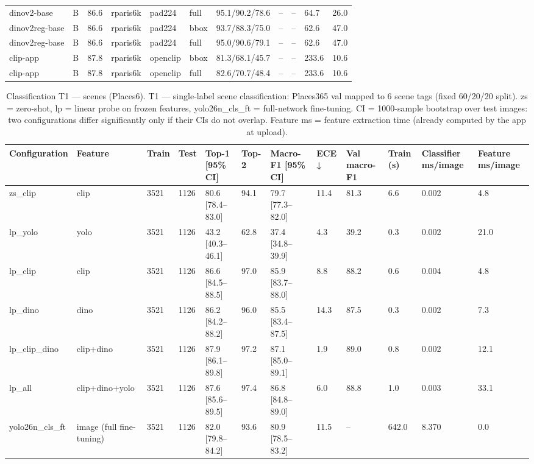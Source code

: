 \begin{table}[ht]
\begin{tabular}{lllllllllll}
dinov2-base & B & 86.6 & rparis6k & pad224 & full & 95.1/90.2/78.6 & – & – & 64.7 & 26.0 \\
dinov2reg-base & B & 86.6 & rparis6k & pad224 & bbox & 93.7/88.3/75.0 & – & – & 62.6 & 47.0 \\
dinov2reg-base & B & 86.6 & rparis6k & pad224 & full & 95.0/90.6/79.1 & – & – & 62.6 & 47.0 \\
clip-app & B & 87.8 & rparis6k & openclip & bbox & 81.3/68.1/45.7 & – & – & 233.6 & 10.6 \\
clip-app & B & 87.8 & rparis6k & openclip & full & 82.6/70.7/48.4 & – & – & 233.6 & 10.6 \\
\bottomrule
\end{tabular}
\end{table}

\begin{table}[ht]
\centering
\small
\caption{Classification T1 — scenes (Places6). T1 — single-label scene classification: Places365 val mapped to 6 scene tags (fixed 60/20/20 split). zs = zero-shot, lp = linear probe on frozen features, yolo26n\_cls\_ft = full-network fine-tuning. CI = 1000-sample bootstrap over test images: two configurations differ significantly only if their CIs do not overlap. Feature ms = feature extraction time (already computed by the app at upload).}
\begin{tabular}{llllllllllll}
\toprule
Configuration & Feature & Train & Test & Top-1 [95\% CI] & Top-2 & Macro-F1 [95\% CI] & ECE ↓ & Val macro-F1 & Train (s) & Classifier ms/image & Feature ms/image \\
\midrule
zs\_clip & clip & 3521 & 1126 & 80.6 [78.4–83.0] & 94.1 & 79.7 [77.3–82.0] & 11.4 & 81.3 & 6.6 & 0.002 & 4.8 \\
lp\_yolo & yolo & 3521 & 1126 & 43.2 [40.3–46.1] & 62.8 & 37.4 [34.8–39.9] & 4.3 & 39.2 & 0.3 & 0.002 & 21.0 \\
lp\_clip & clip & 3521 & 1126 & 86.6 [84.5–88.5] & 97.0 & 85.9 [83.7–88.0] & 8.8 & 88.2 & 0.6 & 0.004 & 4.8 \\
lp\_dino & dino & 3521 & 1126 & 86.2 [84.2–88.2] & 96.0 & 85.5 [83.4–87.5] & 14.3 & 87.5 & 0.3 & 0.002 & 7.3 \\
lp\_clip\_dino & clip+dino & 3521 & 1126 & 87.9 [86.1–89.8] & 97.2 & 87.1 [85.0–89.1] & 1.9 & 89.0 & 0.8 & 0.002 & 12.1 \\
lp\_all & clip+dino+yolo & 3521 & 1126 & 87.6 [85.6–89.5] & 97.4 & 86.8 [84.8–89.0] & 6.0 & 88.8 & 1.0 & 0.003 & 33.1 \\
yolo26n\_cls\_ft & image (full fine-tuning) & 3521 & 1126 & 82.0 [79.8–84.2] & 93.6 & 80.9 [78.5–83.2] & 11.5 & – & 642.0 & 8.370 & 0.0 \\
\bottomrule
\end{tabular}
\end{table}

